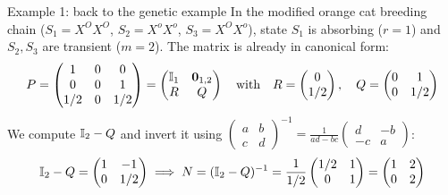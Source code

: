 \documentclass[aspectratio=169]{beamer}\usepackage[]{graphicx}\usepackage[]{xcolor}
\begin{document}
\begin{frame}{Example 1: back to the genetic example}
In the modified orange cat breeding chain ($S_1 = X^O X^O$, $S_2 = X^o X^o$, $S_3 = X^O X^o$), state $S_1$ is absorbing ($r=1$) and $S_2, S_3$ are transient ($m=2$). The matrix is already in canonical form:
\[
P = \begin{pmatrix}
1 & 0 & 0 \\
0 & 0 & 1 \\
1/2 & 0 & 1/2
\end{pmatrix}
= \begin{pmatrix}
\II_1 & \b0_{1,2} \\
R & Q
\end{pmatrix}
\quad \text{with} \quad
R = \begin{pmatrix} 0 \\ 1/2 \end{pmatrix}, \quad
Q = \begin{pmatrix} 0 & 1 \\ 0 & 1/2 \end{pmatrix}
\]
\vfill
We compute $\mathbb{I}_2 - Q$ and invert it using $\begin{pmatrix} a & b \\ c & d \end{pmatrix}^{-1} = \frac{1}{ad-bc}\begin{pmatrix} d & -b \\ -c & a \end{pmatrix}$:
\[
\mathbb{I}_2 - Q = \begin{pmatrix} 1 & -1 \\ 0 & 1/2 \end{pmatrix}
\implies
N = (\mathbb{I}_2 - Q)^{-1} = \frac{1}{1/2} \begin{pmatrix} 1/2 & 1 \\ 0 & 1 \end{pmatrix} = \begin{pmatrix} 1 & 2 \\ 0 & 2 \end{pmatrix}
\]
\end{frame}
\end{document}
